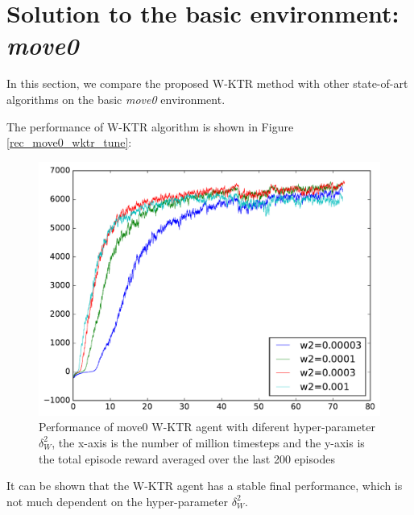 \section{Solution to the basic environment: \textit{move0}}
In this section, we compare the proposed W-KTR method with other state-of-art algorithms on the basic \textit{move0} environment.

The performance of W-KTR algorithm is shown in Figure \ref{rec_move0_wktr_tune}:

\begin{figure}[h]
\includegraphics[width=\textwidth]{images/rec_move0_wktr_tune.pdf}
\centering
\caption{Performance of move0 W-KTR agent with diferent hyper-parameter $\delta_W^2$, the x-axis is the number of million timesteps and the y-axis is the total episode reward averaged over the last 200 episodes}
\end{figure}\label{rec_move0_wktr_tune}
It can be shown that the W-KTR agent has a stable final performance, which is not much dependent on the hyper-parameter $\delta_W^2$.

